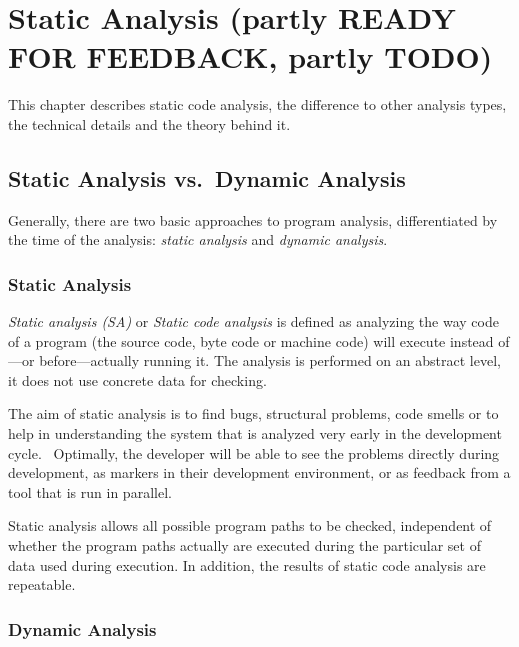 \chapter{Static Analysis (partly READY FOR FEEDBACK, partly TODO)}
\label{static-analysis}

This chapter describes static code analysis, the difference to other analysis types, the technical details and the theory behind it.

\section{Static Analysis vs.~Dynamic Analysis}

Generally, there are two basic approaches to program analysis, differentiated by the time of the analysis: \emph{static analysis} and \emph{dynamic analysis}.

\subsection{Static Analysis}

\emph{Static analysis (SA)} or \emph{Static code analysis} is defined as analyzing the way code of a program (the source code, byte code or machine code) will execute instead of---or before---actually running it. The analysis is performed on an abstract level, \ie it does not use concrete data for checking.~\cite{static-code-analysis}

The aim of static analysis is to find bugs, structural problems, code smells or to help in understanding the system that is analyzed very early in the development cycle.~\cite{data-flow-analysis, chess-west} Optimally, the developer will be able to see the problems directly during development, \eg as markers in their development environment, or as feedback from a tool that is run in parallel.

Static analysis allows all possible program paths to be checked, independent of whether the program paths actually are executed during the particular set of data used during execution. In addition, the results of static code analysis are repeatable.~\cite{coverity-report}

\subsection{Dynamic Analysis}

